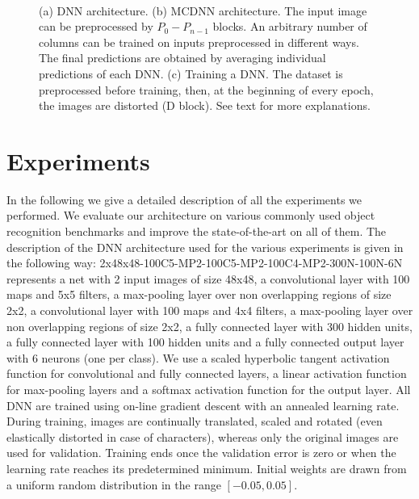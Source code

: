 \documentclass[a4paper]{article}
\begin{document}
\begin{figure}[h!]
    \centering
    \setlength{\fboxsep}{10pt}
    \setlength{\fboxrule}{0pt}
\\
    \caption{(a) DNN architecture. (b) MCDNN architecture. The input image can be preprocessed by $P_{0}-P_{n-1}$ blocks. An arbitrary number of columns can be trained on inputs preprocessed in different ways. The final predictions are obtained by averaging individual predictions of each DNN. (c) Training a DNN.
The dataset is preprocessed before training, then, at the beginning of every epoch, the images are distorted (D block). See text for more explanations.
}
\label{fig:MCDNN}
\end{figure}


\section{Experiments}

In the following we give a detailed description of all the experiments we performed. We evaluate our architecture on various commonly used object recognition benchmarks and improve the state-of-the-art on all of them. The description of the DNN architecture used for the various experiments is given in the following way: 2x48x48-100C5-MP2-100C5-MP2-100C4-MP2-300N-100N-6N represents a net with 2 input images of size 48x48, a convolutional layer with 100 maps and 5x5 filters, a max-pooling layer over non overlapping regions of size 2x2, a convolutional layer with 100 maps and 4x4 filters, a max-pooling layer over non overlapping regions of size 2x2, a fully connected layer with 300 hidden units, a fully connected layer with 100 hidden units and a fully connected output layer with 6 neurons (one per class). We use a scaled hyperbolic tangent activation function for convolutional and fully connected layers, a linear activation function for max-pooling layers and a softmax activation function for the output layer. All DNN are trained using on-line gradient descent with an annealed learning rate. During training, images are continually translated, scaled and rotated (even elastically distorted in case of characters), whereas only the original images are used for validation. Training ends once the validation error is zero or when the learning rate reaches its predetermined minimum. Initial weights are drawn from a uniform random distribution in the range $[-0.05,0.05]$.
\end{document}
